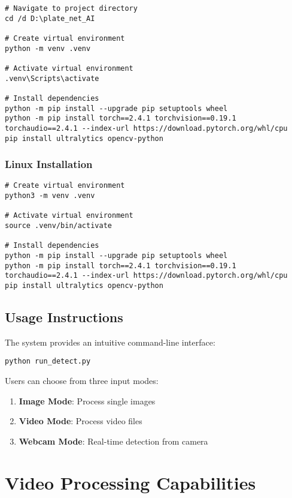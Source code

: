 \documentclass[12pt,a4paper]{article}
\begin{document}
\begin{lstlisting}[caption=Windows Setup Commands]
# Navigate to project directory
cd /d D:\plate_net_AI

# Create virtual environment
python -m venv .venv

# Activate virtual environment
.venv\Scripts\activate

# Install dependencies
python -m pip install --upgrade pip setuptools wheel
python -m pip install torch==2.4.1 torchvision==0.19.1 torchaudio==2.4.1 --index-url https://download.pytorch.org/whl/cpu
pip install ultralytics opencv-python
\end{lstlisting}

\subsubsection{Linux Installation}

\begin{lstlisting}[caption=Linux Setup Commands]
# Create virtual environment
python3 -m venv .venv

# Activate virtual environment
source .venv/bin/activate

# Install dependencies
python -m pip install --upgrade pip setuptools wheel
python -m pip install torch==2.4.1 torchvision==0.19.1 torchaudio==2.4.1 --index-url https://download.pytorch.org/whl/cpu
pip install ultralytics opencv-python
\end{lstlisting}

\subsection{Usage Instructions}

The system provides an intuitive command-line interface:

\begin{lstlisting}[caption=Running the Detection System]
python run_detect.py
\end{lstlisting}

Users can choose from three input modes:
\begin{enumerate}
    \item \textbf{Image Mode}: Process single images
    \item \textbf{Video Mode}: Process video files
    \item \textbf{Webcam Mode}: Real-time detection from camera
\end{enumerate}

\section{Video Processing Capabilities}
\end{document}
